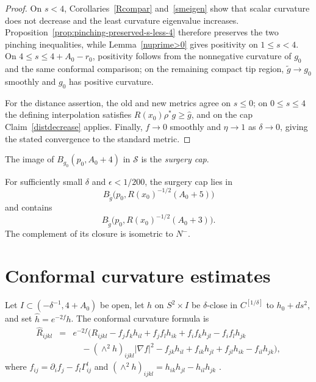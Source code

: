 \begin{proof}
\sketch
On $s<4$, Corollaries~\ref{Rcompar} and~\ref{smeigen} show that scalar
curvature does not decrease and the least curvature eigenvalue increases.
Proposition~\ref{prop:pinching-preserved-s-less-4} therefore preserves the two
pinching inequalities, while Lemma~\ref{nuprime>0} gives positivity on
$1\leq s<4$. On $4\leq s\leq4+A_0-r_0$, positivity follows from the
nonnegative curvature of $g_0$ and the same conformal comparison; on the
remaining compact tip region, $\widetilde g\to g_0$ smoothly and $g_0$ has
positive curvature.

For the distance assertion, the old and new metrics agree on $s\leq0$;
on $0\leq s\leq4$ the defining interpolation satisfies
$R(x_0)\rho^*g\geq\widehat g$, and on the cap Claim~\ref{distdecrease}
applies. Finally, $f\to0$ smoothly and $\eta\to1$ as $\delta\to0$, giving the
stated convergence to the standard metric.
\end{proof}

\begin{definition}
\label{def:surgery-cap}
\label{surgerycap}
The image of $B_{g_0}(p_0,A_0+4)$ in ${\mathcal S}$ is the
\emph{surgery cap}.
\end{definition}

\begin{lemma}
\label{lem:surgery-cap-ball-bounds}

\label{capball}
For sufficiently small $\delta$ and $\epsilon<1/200$, the surgery cap lies in
\[
  B_{\widetilde g}
  \bigl(p_0,R(x_0)^{-1/2}(A_0+5)\bigr)
\]
and contains
\[
  B_{\widetilde g}
  \bigl(p_0,R(x_0)^{-1/2}(A_0+3)\bigr).
\]
The complement of its closure is isometric to $N^-$.
\end{lemma}

\section{Conformal curvature estimates}

Let $I\subset(-\delta^{-1},4+A_0)$ be open, let $h$ on $S^2\times I$ be
$\delta$-close in $C^{[1/\delta]}$ to $h_0+ds^2$, and set
$\widehat h=e^{-2f}h$. The conformal curvature formula is
\begin{eqnarray}
\label{confchange}
\widehat R_{ijkl}
&=&e^{-2f}\bigl(R_{ijkl}-f_jf_kh_{il}+f_jf_lh_{ik}
+f_if_kh_{jl}-f_if_lh_{jk}\\
&&\quad-(\wedge^2h)_{ijkl}|\nabla f|^2-f_{jk}h_{il}+f_{ik}h_{jl}
+f_{jl}h_{ik}-f_{il}h_{jk}\bigr),\nonumber
\end{eqnarray}
where $f_{ij}=\partial_if_j-f_l\Gamma^l_{ij}$ and
$(\wedge^2h)_{ijkl}=h_{ik}h_{jl}-h_{il}h_{jk}$ \cite{Sakai}.

